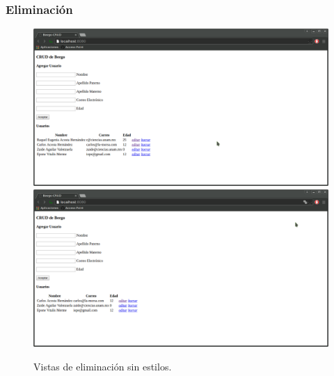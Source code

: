 \documentclass[12pt]{article}
\begin{document}
\subsubsection{Eliminación}\label{sec:delete}
\begin{figure}[H]
  \includegraphics[width=1\textwidth]{delete}
  \includegraphics[width=1\textwidth]{delete2}
  \caption{Vistas de eliminación sin estilos.}
\end{figure}
\end{document}
